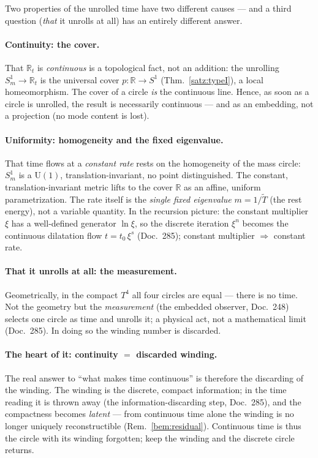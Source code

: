 Two properties of the unrolled time have two different causes --- and a third question
(\emph{that} it unrolls at all) has an entirely different answer.

\paragraph{Continuity: the cover.} That $\mathbb{R}_t$ is \emph{continuous} is a topological
fact, not an addition: the unrolling $S^1_m\to\mathbb{R}_t$ is the universal cover
$p:\mathbb{R}\to S^1$ (Thm.~\ref{satz:typeI}), a local homeomorphism. The cover of a circle
\emph{is} the continuous line. Hence, as soon as a circle is unrolled, the result is
necessarily continuous --- and as an embedding, not a projection (no mode content is lost).

\paragraph{Uniformity: homogeneity and the fixed eigenvalue.} That time flows at a
\emph{constant rate} rests on the homogeneity of the mass circle: $S^1_m$ is a U$(1)$,
translation-invariant, no point distinguished. The constant, translation-invariant metric
lifts to the cover $\mathbb{R}$ as an affine, uniform parametrization. The rate itself is the
\emph{single fixed eigenvalue} $m=1/\tilde T$ (the rest energy), not a variable quantity. In
the recursion picture: the constant multiplier $\xi$ has a well-defined generator $\ln\xi$,
so the discrete iteration $\xi^n$ becomes the continuous dilatation flow $t=t_0\,\xi^s$
(Doc.~285); constant multiplier $\Rightarrow$ constant rate.

\paragraph{That it unrolls at all: the measurement.} Geometrically, in the compact $T^4$ all
four circles are equal --- there is no time. Not the geometry but the \emph{measurement} (the
embedded observer, Doc.~248) selects one circle as time and unrolls it; a physical act, not a
mathematical limit (Doc.~285). In doing so the winding number is discarded.

\paragraph{The heart of it: continuity $=$ discarded winding.} The real answer to ``what makes
time continuous'' is therefore the discarding of the winding. The winding is the discrete,
compact information; in the time reading it is thrown away (the information-discarding step,
Doc.~285), and the compactness becomes \emph{latent} --- from continuous time alone the winding
is no longer uniquely reconstructible (Rem.~\ref{bem:residual}). Continuous time is thus the
circle with its winding forgotten; keep the winding and the discrete circle returns.

